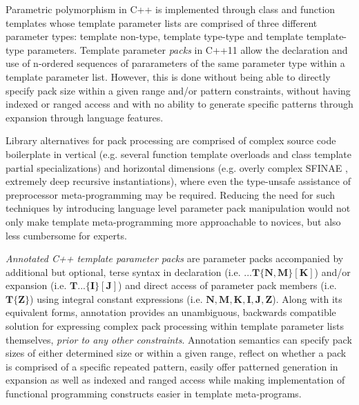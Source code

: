 
\p Parametric polymorphism in C++ is implemented through class and function templates whose template parameter lists are comprised of three different parameter types: template non-type, template type-type and template template-type parameters.
Template parameter \textit{packs} in C++11 \cite{cpp11} allow the declaration and use of n-ordered sequences of pararameters of the same parameter type within a template parameter list.
However, this is done without being able to directly specify pack size within a given range and/or pattern constraints, without having indexed or ranged access and with no ability to generate specific patterns through expansion through language features.

\p Library alternatives for pack processing are comprised of complex source code boilerplate in vertical (e.g. several function template overloads and class template partial specializations) and horizontal dimensions (e.g. overly complex SFINAE \cite{sfinae,JarviWL03}, extremely deep recursive instantiations), where even the type-unsafe assistance of preprocessor meta-programming may be required.
Reducing the need for such techniques by introducing language level parameter pack manipulation would not only make template meta-programming more approachable to novices, but also less cumbersome for experts.

\p \textit{Annotated C++ template parameter packs} are parameter packs accompanied by additional but optional, terse syntax in declaration (i.e. $\bm{...T\{N,M\}[K]}$) and/or expansion (i.e. $\bm{T...\{I\}[J]}$) and direct access of parameter pack members (i.e. $\bm{T\{Z\}}$) using integral constant expressions (i.e. $\bm{N,M,K,I,J,Z}$).
Along with its equivalent forms, annotation provides an unambiguous, backwards compatible solution for expressing complex pack processing within template parameter lists themselves, \textit{prior to any other constraints}.
Annotation semantics can specify pack sizes of either determined size or within a given range, reflect on whether a pack is comprised of a specific repeated pattern, easily offer patterned generation in expansion as well as indexed and ranged access while making implementation of functional programming constructs easier in template meta-programs.
